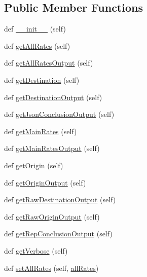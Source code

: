 \subsection*{Public Member Functions}
\begin{DoxyCompactItemize}
\item 
def \hyperlink{classe2e_1_1_parameters_a335faddfa9af3ed8ac441e92faec0946}{\+\_\+\+\_\+init\+\_\+\+\_\+} (self)
\item 
def \hyperlink{classe2e_1_1_parameters_a73ef5c8c54974e3ce7a2a522c299fd34}{get\+All\+Rates} (self)
\item 
def \hyperlink{classe2e_1_1_parameters_af47d493a07f5127e633d5efccb5fac5e}{get\+All\+Rates\+Output} (self)
\item 
def \hyperlink{classe2e_1_1_parameters_ad984826a5973fff569b554b44245b714}{get\+Destination} (self)
\item 
def \hyperlink{classe2e_1_1_parameters_a4451a6d8224c2216fdef8e53e55fadaf}{get\+Destination\+Output} (self)
\item 
def \hyperlink{classe2e_1_1_parameters_ae343f8409c393d17d08a8626efea6572}{get\+Json\+Conclusion\+Output} (self)
\item 
def \hyperlink{classe2e_1_1_parameters_a067ce19caffb5ed5479219a911219c31}{get\+Main\+Rates} (self)
\item 
def \hyperlink{classe2e_1_1_parameters_a7f42c96565591076b9ae5b06ce364bec}{get\+Main\+Rates\+Output} (self)
\item 
def \hyperlink{classe2e_1_1_parameters_ac570cc2f199bcb82a4634be79110a013}{get\+Origin} (self)
\item 
def \hyperlink{classe2e_1_1_parameters_af0cdd8e6726ccc72387e466c2abe04c2}{get\+Origin\+Output} (self)
\item 
def \hyperlink{classe2e_1_1_parameters_a0536c6870c6371025927f435e47704ed}{get\+Raw\+Destination\+Output} (self)
\item 
def \hyperlink{classe2e_1_1_parameters_a4ed96c7861e649d101984ff5c8056691}{get\+Raw\+Origin\+Output} (self)
\item 
def \hyperlink{classe2e_1_1_parameters_a54d1dd9d1af9541d3347766e06df65ca}{get\+Rep\+Conclusion\+Output} (self)
\item 
def \hyperlink{classe2e_1_1_parameters_a1e5e7e1986b641b01d4c24690a6d48eb}{get\+Verbose} (self)
\item 
def \hyperlink{classe2e_1_1_parameters_a764caaf0903863ccf240217b15999dc0}{set\+All\+Rates} (self, \hyperlink{classe2e_1_1_parameters_a60eeea35185af8b13a6ea9d797a38dc7}{all\+Rates})

\end{DoxyCompactItemize}
